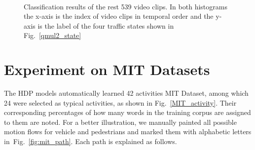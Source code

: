 \clearpage
\newpage
\begin{landscape}
	\begin{figure}[h]
		\centering
		\\
		\caption[Classification results of QMUL Junction Dataset 2]{Classification results of the rest 539 video clips. In both histograms the x-axis is the index of video clips in temporal order and the y-axis is the label of the four traffic states shown in Fig.~\ref{qmul2_state}}
		\label{fig:qmul2_classification_result}
	\end{figure}
\end{landscape}

\section{Experiment on MIT Datasets}
\label{exp:mit}
The HDP models automatically learned 42 activities MIT Dataset, among which 24 were selected as typical activities, as shown in Fig.~\ref{MIT_activity}. Their corresponding percentages of how many words in the training corpus are assigned to them are noted. For a better illustration, we manually painted all possible motion flows for vehicle and pedestrians and marked them with alphabetic letters in~Fig.~\ref{fig:mit_path}. Each path is explained as follows.

